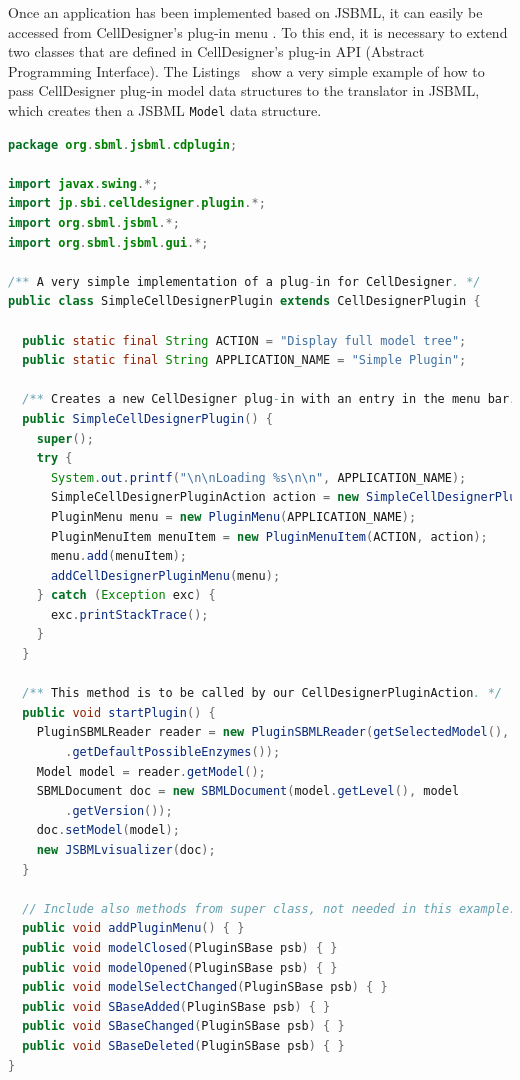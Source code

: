 \documentclass[
  BCOR12mm,
  letterpaper,
  11pt,
  headsepline,
  pointlessnumbers,
  tablecaptionabove,
  headinclude,
  appendixprefix,
  idxtotoc,
  bibtotoc,
  twoside,
  titlepage
]{scrartcl}
\begin{document}
Once an application has been implemented based on JSBML, it can easily be
accessed from CellDesigner's plug-in menu \citep{Funahashi2003}. To this end,
it is necessary to extend two classes that are defined in CellDesigner's plug-in
API (Abstract Programming Interface). The
Listings~ show a very simple example of
how to pass CellDesigner plug-in model data structures to the translator in
JSBML, which creates then a JSBML \verb!Model! data structure.

% 
\begin{lstlisting}[language=Java,float,caption={A simple example for a
CellDesigner plug-in using JSBML as a communication layer},label=lst:Plugin]
package org.sbml.jsbml.cdplugin;

import javax.swing.*;
import jp.sbi.celldesigner.plugin.*;
import org.sbml.jsbml.*;
import org.sbml.jsbml.gui.*;

/** A very simple implementation of a plug-in for CellDesigner. */
public class SimpleCellDesignerPlugin extends CellDesignerPlugin {

  public static final String ACTION = "Display full model tree";
  public static final String APPLICATION_NAME = "Simple Plugin";

  /** Creates a new CellDesigner plug-in with an entry in the menu bar. */
  public SimpleCellDesignerPlugin() {
    super();
    try {
      System.out.printf("\n\nLoading %s\n\n", APPLICATION_NAME);
      SimpleCellDesignerPluginAction action = new SimpleCellDesignerPluginAction(this);
      PluginMenu menu = new PluginMenu(APPLICATION_NAME);
      PluginMenuItem menuItem = new PluginMenuItem(ACTION, action);
      menu.add(menuItem);
      addCellDesignerPluginMenu(menu);
    } catch (Exception exc) {
      exc.printStackTrace();
    }
  }

  /** This method is to be called by our CellDesignerPluginAction. */
  public void startPlugin() {
    PluginSBMLReader reader = new PluginSBMLReader(getSelectedModel(), SBO
        .getDefaultPossibleEnzymes());
    Model model = reader.getModel();
    SBMLDocument doc = new SBMLDocument(model.getLevel(), model
        .getVersion());
    doc.setModel(model);
    new JSBMLvisualizer(doc);
  }

  // Include also methods from super class, not needed in this example.
  public void addPluginMenu() { }
  public void modelClosed(PluginSBase psb) { }
  public void modelOpened(PluginSBase psb) { }
  public void modelSelectChanged(PluginSBase psb) { }
  public void SBaseAdded(PluginSBase psb) { }
  public void SBaseChanged(PluginSBase psb) { }
  public void SBaseDeleted(PluginSBase psb) { }
}
\end{lstlisting}
\end{document}

